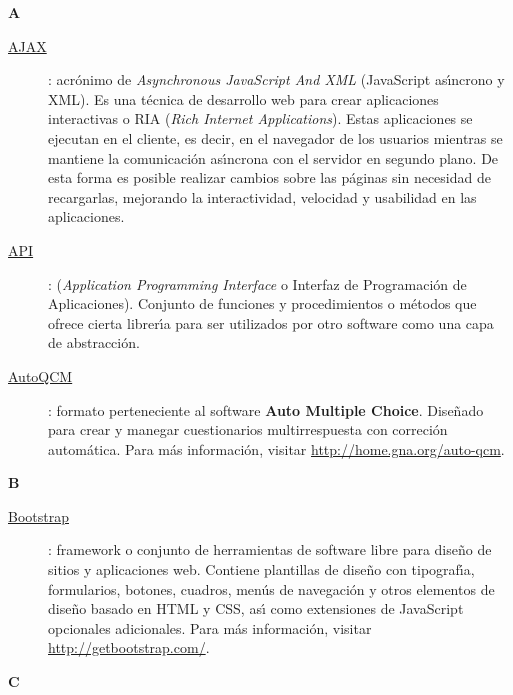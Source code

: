 {\bfseries {\Huge A}}\label{Apendice1:A}
\bigskip
\bigskip

\begin{description}
  \item[\underline{AJAX}\label{apend1:ajax}]: acr\'onimo de \textit{Asynchronous JavaScript And XML} (JavaScript as\'{\i}ncrono y XML). Es una t\'ecnica de desarrollo web para crear aplicaciones 
  interactivas o RIA (\textit{Rich Internet Applications}). Estas aplicaciones se ejecutan en el cliente, es decir, en el navegador de los usuarios mientras se 
  mantiene la comunicaci\'on as\'{\i}ncrona con el servidor en segundo plano. De esta forma es posible realizar cambios sobre las p\'aginas sin necesidad de 
  recargarlas, mejorando la interactividad, velocidad y usabilidad en las aplicaciones.
  \bigskip
  
  \item[\underline{API}\label{apend1:api}]: (\textit{Application Programming Interface} o Interfaz de Programaci\'on de Aplicaciones). Conjunto de funciones y procedimientos o m\'etodos que 
  ofrece cierta librer\'{\i}a para ser utilizados por otro software como una capa de abstracci\'on. 
  \bigskip

  \item[\underline{AutoQCM}\label{apend1:aqcm}]: formato perteneciente al software {\bfseries Auto Multiple Choice}. Dise\~{n}ado para crear y manegar cuestionarios multirrespuesta con correci\'on
  autom\'atica. Para m\'as informaci\'on, visitar {\small \url{http://home.gna.org/auto-qcm}}.
\end{description}

\bigskip
{\bfseries {\Huge B}}\label{Apendice1:B}
\bigskip
\bigskip

\begin{description}
  \item[\underline{Bootstrap}\label{apend1:bootstrap}]: framework o conjunto de herramientas de software libre para dise\~{n}o de sitios y aplicaciones web. 
  Contiene plantillas de dise\~{n}o con tipograf\'{\i}a, formularios, botones, cuadros, men\'us de navegaci\'on y otros elementos de dise\~{n}o basado en HTML 
  y CSS, as\'{\i} como extensiones de JavaScript opcionales adicionales. Para m\'as informaci\'on, visitar {\small \url{http://getbootstrap.com/}}.
  \bigskip
\end{description}

\bigskip
{\bfseries {\Huge C}}\label{Apendice1:C}
\bigskip
\bigskip

